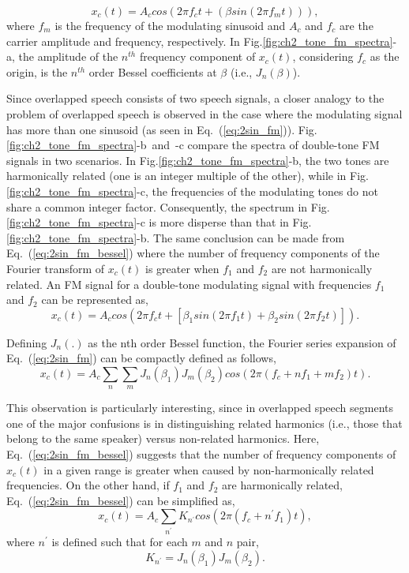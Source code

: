 {\begin{equation}
\label{eq:1sin_fm}
x_c(t) = A_ccos(2\pi f_ct+(\beta sin(2\pi f_mt))),
\end{equation}
where $f_m$ is the frequency of the modulating sinusoid and $A_c$ and $f_c$ are the carrier amplitude and frequency, respectively. 
In Fig.\ref{fig:ch2_tone_fm_spectra}-a, the amplitude of the $n^{th}$ frequency component of $x_c(t)$, considering $f_c$ as the origin, is the $n^{th}$ order Bessel coefficients at $\beta$ (i.e., $J_n(\beta)$). 

Since overlapped speech consists of two speech signals, a closer analogy to the problem of overlapped speech is observed in the case where the modulating signal has more than one sinusoid (as seen in Eq.~(\ref{eq:2sin_fm})). 
Fig.\ref{fig:ch2_tone_fm_spectra}-b~and~-c compare the spectra of double-tone FM signals in two scenarios. 
In Fig.\ref{fig:ch2_tone_fm_spectra}-b, the two tones are harmonically related (one is an integer multiple of the other), while in Fig.\ref{fig:ch2_tone_fm_spectra}-c, the frequencies of the modulating tones do not share a common integer factor. 
Consequently, the spectrum in Fig. \ref{fig:ch2_tone_fm_spectra}-c is more disperse than that in Fig.\ref{fig:ch2_tone_fm_spectra}-b. 
The same conclusion can be made from Eq.~(\ref{eq:2sin_fm_bessel}) where the number of frequency components of the Fourier transform of $x_c(t)$ is greater when $f_1$ and $f_2$ are not harmonically related. 
An FM signal for a double-tone modulating signal with frequencies $f_1$ and $f_2$ can be represented as,
\begin{equation}
\label{eq:2sin_fm}
x_c(t) = A_ccos(2\pi f_ct+[\beta_1 sin(2\pi f_1t) + \beta_2 sin(2\pi f_2t)]).
\end{equation}

Defining $J_n(.)$ as the nth order Bessel function, the Fourier series expansion of Eq.~(\ref{eq:2sin_fm}) can be compactly defined as follows, 
\begin{equation}
\label{eq:2sin_fm_bessel}
x_c(t) = A_c\sum\limits_n\sum\limits_m J_n(\beta_1)J_m(\beta_2)cos(2\pi (f_c+nf_1+mf_2)t).
\end{equation}

This observation is particularly interesting, since in overlapped speech segments one of the major confusions is in distinguishing related harmonics (i.e., those that belong to the same speaker) versus non-related harmonics. 
Here, Eq.~(\ref{eq:2sin_fm_bessel}) suggests that the number of frequency components of $x_c(t)$ in a given range is greater when caused by non-harmonically related frequencies. 
On the other hand, if $f_1$ and $f_2$ are harmonically related, Eq.~(\ref{eq:2sin_fm_bessel}) can be simplified as, 
\begin{equation}
\label{eq:2sin_fm_bessel_simplified}
x_c(t) = A_c\sum\limits_{n^\prime} K_{n^\prime}cos(2\pi (f_c + n^\prime f_1)t),
\end{equation}
where $n^\prime$ is defined such that for each $m$ and $n$ pair,
\begin{equation}
\label{eq:knprime}
K_{n^\prime} = J_n(\beta_1)J_m(\beta_2). 
\end{equation}


}

